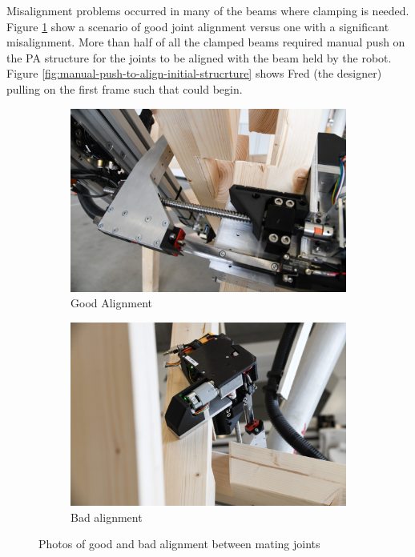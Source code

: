 Misalignment problems occurred in many of the beams where clamping is needed. Figure \ref{fig:good-bad-alignment} show a scenario of good joint alignment versus one with a significant misalignment. More than half of all the clamped beams required manual push on the PA structure for the joints to be aligned with the beam held by the robot. Figure \ref{fig:manual-push-to-align-initial-strucrture} shows Fred (the designer) pulling on the first frame such that  could begin.

\begin{figure}[!h]
    \centering
    \begin{subfigure}[b]{0.49\textwidth}
        \centering
        \includegraphics[width=\textwidth]{images/05/image104.jpg}
        \caption{Good Alignment}
    \end{subfigure}
    \hfill
    \begin{subfigure}[b]{0.49\textwidth}
        \centering
        \includegraphics[width=\textwidth]{images/05/image11.jpg}
        \caption{Bad alignment}
    \end{subfigure}
    \caption{Photos of good and bad alignment between mating joints}
    \label{fig:good-bad-alignment}
\end{figure}

